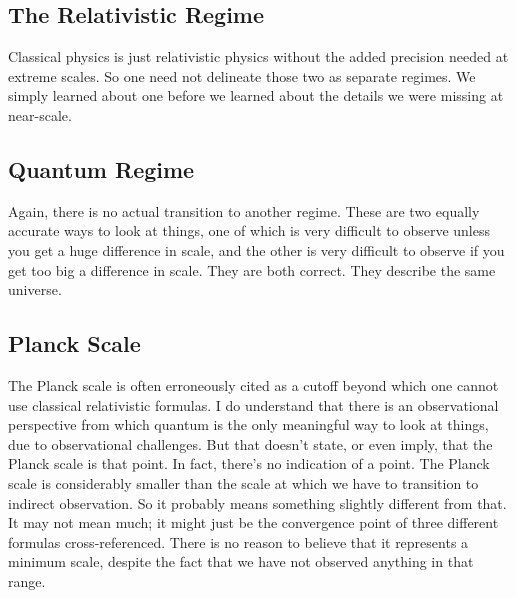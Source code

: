 \documentclass[twoside,twocolumn,9pt]{article}
\begin{document}
\subsection{The Relativistic Regime}
Classical physics is just relativistic physics without the added precision needed at extreme scales. So one need not delineate those two as separate regimes. We simply learned about one before we learned about the details we were missing at near-scale.

\subsection{Quantum Regime}
Again, there is no actual transition to another regime. These are two equally accurate ways to look at things, one of which is very difficult to observe unless you get a huge difference in scale, and the other is very difficult to observe if you get too big a difference in scale. They are both correct. They describe the same universe.

\subsection{Planck Scale}
The Planck scale is often erroneously cited as a cutoff beyond which one cannot use classical relativistic formulas. I do understand that there is an observational perspective from which quantum is the only meaningful way to look at things, due to observational challenges. But that doesn't state, or even imply, that the Planck scale is that point. In fact, there's no indication of a point. The Planck scale is considerably smaller than the scale at which we have to transition to indirect observation. So it probably means something slightly different from that. It may not mean much; it might just be the convergence point of three different formulas cross-referenced. There is no reason to believe that it represents a minimum scale, despite the fact that we have not observed anything in that range.

\balance
\clearpage
\end{document}
